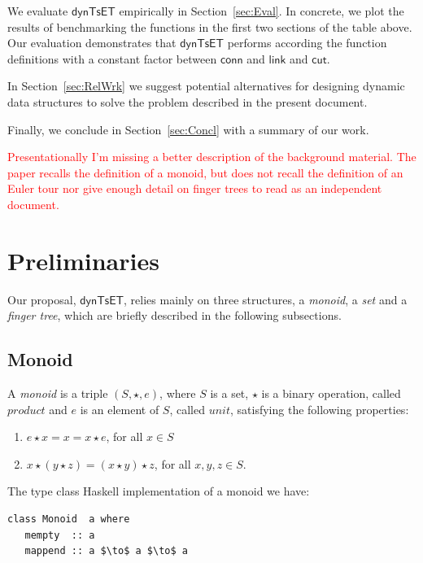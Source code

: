 \documentclass{elsarticle}
\newcommand{\tcr} [1]{\textcolor{red}{#1}}
\newcommand{\MATHSF}[1]{\ensuremath{\mathsf{#1}}\xspace}
\newcommand{\link}{\MATHSF{link}}
\newcommand{\cut}{\MATHSF{cut}}
\newcommand{\conn}{\MATHSF{conn}}
\newcommand{\dyntset}{\MATHSF{dynTsET}}
\begin{document}
We evaluate \dyntset empirically in Section~\ref{sec:Eval}. In concrete, we plot the results of benchmarking the functions in the first two sections of the table above. Our evaluation demonstrates that \dyntset performs according the function definitions with a constant factor between \conn and \link and \cut. 

In Section~\ref{sec:RelWrk} we suggest potential alternatives for designing dynamic data structures to solve the problem described in the present document. 

Finally, we conclude in Section~\ref{sec:Concl} with a summary of our work.


\tcr{Presentationally I'm missing a better description of the background material. The paper recalls the definition of a monoid, but does not recall the definition of an Euler tour nor give enough detail on finger trees to read as an independent document.} 




\section{Preliminaries} 
\label{sec:Prelim} 

Our proposal, \dyntset, relies mainly on three structures, a \textit{monoid}, a \textit{set} and a \textit{finger tree}, which are briefly described in the following subsections. 

\subsection{Monoid}

A \textit{monoid} is a triple $(S,\star,e)$, where $S$ is a set, $\star$ is a binary operation, called $product$ and $e$ is an element of $S$, called $unit$, satisfying the following properties:

\begin{enumerate}
\item $e \star x = x = x \star e$, for all $x \in S$ 
\item $x \star (y \star z) = (x \star y) \star z $, for all $x,y,z \in S$.  
\end{enumerate}

The type class Haskell implementation of a monoid we have:
\begin{lstlisting}[mathescape]
class Monoid  a where 
   mempty  :: a
   mappend :: a $\to$ a $\to$ a
\end{lstlisting}   
\end{document}
